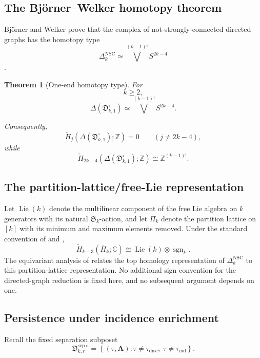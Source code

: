 \documentclass[11pt]{article}
\theoremstyle{plain}
\newtheorem{theorem}{Theorem}[section]
\theoremstyle{definition}
\begin{document}
\subsection{The Bj\"orner--Welker homotopy theorem}
\label{subsec:BW-homotopy}

Björner and Welker prove that the complex of not-strongly-connected
directed graphs has the homotopy type
\[
\Delta_k^{\mathrm{NSC}}
\simeq
\bigvee^{(k-1)!}S^{2k-4}
\]
\citep{BjornerWelker1999}.


\begin{theorem}[One-end homotopy type]
\label{thm:one-end-homotopy}
For
\[
k\geq2,
\]
\[
\Delta(
\mathfrak D_{k,1}^{\circ}
)
\simeq
\bigvee^{(k-1)!}S^{2k-4}.
\]

Consequently,
\[
\widetilde H_j
\left(
\Delta(
\mathfrak D_{k,1}^{\circ}
);
\mathbb Z
\right)
=
0
\qquad
(j\neq2k-4),
\]
while
\[
\widetilde H_{2k-4}
\left(
\Delta(
\mathfrak D_{k,1}^{\circ}
);
\mathbb Z
\right)
\cong
\mathbb Z^{(k-1)!}.
\]
\end{theorem}

\subsection{The partition-lattice/free-Lie representation}
\label{subsec:free-Lie-representation}

Let $\operatorname{Lie}(k)$ denote the multilinear component of the free Lie
algebra on $k$ generators with its natural $\mathfrak S_k$-action, and let
$\overline{\Pi}_k$ denote the partition lattice on $[k]$ with its minimum and
maximum elements removed.  Under the standard convention of \citet{Stanley1982}
and \citet{Reutenauer1993},
\[
\widetilde H_{k-3}(\overline{\Pi}_k;\mathbb C)
\cong
\operatorname{Lie}(k)\otimes\operatorname{sgn}_k.
\]
The equivariant analysis of \citet{BjornerWelker1999} relates the top homology
representation of $\Delta_k^{\mathrm{NSC}}$ to this partition-lattice
representation.  No additional sign convention for the directed-graph reduction is
fixed here, and no subsequent argument depends on one.

\subsection{Persistence under incidence enrichment}
\label{subsec:Lie-persistence}

Recall the fixed separation subposet
\[
\mathfrak D_{k,r}^{\mathrm{sep}\circ}
=
\left\{
(\tau,\mathbf A):
\tau\neq\tau_{\mathrm{disc}},
\;
\tau\neq\tau_{\mathrm{ind}}
\right\}.
\]
\end{document}

